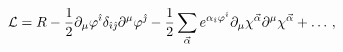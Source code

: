 \begin{equation}
\label{reduce} {\cal L} =R -\frac{1}{2} \partial_\mu {\varphi}^{\hat
\imath}\delta_{\hat \imath \hat \jmath}\partial^\mu  {\varphi}^{\hat 
\jmath} -{1\over2}
\sum_{\vec
\alpha}e^{\alpha_{\hat \imath}  \varphi^{\hat \imath}}
\partial_\mu\chi^{\vec\alpha}\partial^\mu\chi^{\vec\alpha}+\dots \, ,
\end{equation} 
